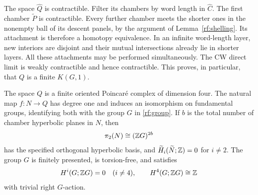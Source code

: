 The space $\widehat Q$ is contractible.  Filter its chambers by word
length in $\widehat C$.  The first chamber $\widetilde P$ is
contractible.  Every further chamber meets the shorter ones in the
nonempty ball of its descent panels, by the argument of
Lemma~\ref{rf:shelling}.  Its attachment is therefore a homotopy
equivalence.  In an infinite word-length layer, new interiors are
disjoint and their mutual intersections already lie in shorter layers.
All these attachments may be performed simultaneously.  The CW
direct limit is weakly contractible and hence contractible.  This
proves, in particular, that $Q$ is a finite $K(G,1)$.

\begin{proposition}
\label{rf:development}
The space $Q$ is a finite oriented Poincar\'e complex of dimension four.
The natural map $f:N\to Q$ has degree one and induces an isomorphism
on fundamental groups, identifying both with the group $G$ in
\eqref{rf:group}.  If $b$ is the total number of chamber hyperbolic
planes in $N$, then
\[
 \pi_2(N)\cong(\mathbb Z G)^{2b}
\]
has the specified orthogonal hyperbolic basis, and
$\widetilde H_i(\widetilde N;\mathbb Z)=0$ for $i\ne2$.
The group $G$ is finitely presented, is torsion-free, and satisfies
\begin{equation}
 \label{rf:pd}
 H^i(G;\mathbb Z G)=0\quad(i\ne4),\qquad
 H^4(G;\mathbb Z G)\cong\mathbb Z
\end{equation}
with trivial right $G$-action.
\end{proposition}


